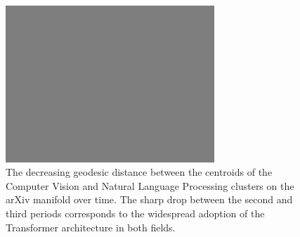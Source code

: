\begin{figure}[h!]
    \centering
    \includegraphics[width=0.7\textwidth]{figures/placeholder.png}
    \caption{The decreasing geodesic distance between the centroids of the Computer Vision and Natural Language Processing clusters on the arXiv manifold over time. The sharp drop between the second and third periods corresponds to the widespread adoption of the Transformer architecture in both fields.}
    \label{fig:arxiv_distance}
\end{figure}